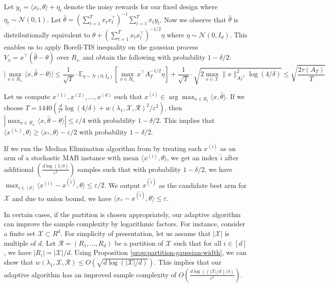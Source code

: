 Let $y_t=\langle x_t,\theta\rangle+\eta_t$ denote the noisy rewards for our fixed design where $\eta_t\sim\mathcal{N}(0,1)$.
Let $\widehat{\theta}=(\sum_{t=1}^T x_tx_t^\top)^{-1}\sum_{t=1}^T x_ty_t$. Now we observe that $\widehat{\theta}$ is distributionally equivalent to $\theta+(\sum_{t=1}^T x_tx_t^\top)^{-1/2}\eta$ where $\eta\sim\mathcal{N}(0,I_d)$. This enables us to apply Borell-TIS inequality on the gaussian process $V_x=x^\top(\widehat{\theta}-\theta)$ over $R_{i_*}$ and obtain the following with probability $1-\delta/2$:
\begin{equation*}
    \Big|\max_{x\in R_{i_*}}\langle x,\widehat{\theta}-\theta\rangle\Big|\leq \frac{1}{\sqrt{T}}\cdot\mathbb{E}_{\eta\sim\mathcal{N}(0,I_d)}\left[\max_{x\in R_{i_*}}x^\top A_T^{-1/2}\eta\right]+\frac{1}{\sqrt{T}}\cdot\sqrt{2\max_{x\in\mathcal{X}}\|x\|_{A_T^{-1}}^2\log(4/\delta)}\leq \sqrt{\frac{2\tau(A_T)}{T}}
\end{equation*}


Let us compute $x^{(1)},x^{(2)},\ldots,x^{(d)}$ such that $x^{(i)}\in\arg\max_{x\in R_i}\langle x,\widehat{\theta}\rangle$. If we choose $T=1440(\frac{d}{\varepsilon^2}\log(4/\delta)+w(\lambda_1,\mathcal{X},\mathcal{R})^2/\varepsilon^2)$, then $|\max_{x\in R_{i_*}}\langle x,\widehat{\theta}-\theta\rangle|\leq \varepsilon/4$ with probability $1-\delta/2$. This implies that $\langle x^{(i_*)},\theta\rangle\geq \langle x_*,\theta\rangle-\varepsilon/2$ with probability $1-\delta/2$. 

If we run the Median Elimination algorithm from \cite{even2002pac} by treating each $x^{(i)}$ as an arm of a stochastic MAB instance with mean $\langle x^{(i)},\theta\rangle$, we get an index $\hat i$ after additional $\left(\frac{d\log(1/\delta)}{\varepsilon^2}\right)$ samples such that with probability $1-\delta/2$, we have $\max_{i\in[d]}\langle x^{(i)}-x^{(\hat i)},\theta\rangle\leq \varepsilon/2$. We output $x^{(\hat i)}$ as the candidate best arm for $\mathcal{X}$ and due to union bound, we have $\langle x_*-x^{(\hat i)},\theta\rangle\leq \varepsilon$.

In certain cases, if the partition is chosen appropriately, our adaptive algorithm can improve the sample complexity by logarithmic factors. For instance, consider a finite set $\mathcal{X}\subset R^d$. For simplicity of presentation, let us assume that $|\mathcal{X}|$ is multiple of $d$. Let $\mathcal{R}=(R_1,\ldots,R_d)$ be a partition of $\mathcal{X}$ such that for all $i\in[d]$, we have $|R_i|=|\mathcal{X}|/d$. Using Proposition \ref{prop:partition-gaussian-width}, we can show that $w(\lambda_1,\mathcal{X},\mathcal{R})\leq O(\sqrt{d\log(|\mathcal{X}|/d)})$. This implies that our adaptive algorithm has an improved sample complexity of $O\left(\frac{d\log((|\mathcal{X}|/d)/\delta )}{\varepsilon^2}\right)$.


